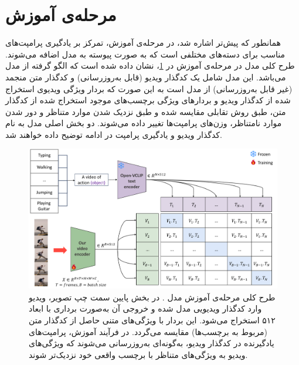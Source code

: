 \section{مرحله‌ی آموزش }
همانطور که پیش‌تر اشاره شد، در مرحله‌ی آموزش، تمرکز بر یادگیری پرامپت‌های مناسب برای دسته‌های مختلفی است که به صورت پیوسته به مدل اضافه می‌شوند. طرح کلی مدل در مرحله‌ی آموزش در \cref{fig.33}، نشان داده شده است که الگو گرفته از مدل  می‌باشد. این مدل شامل یک کدگذار ویدیو (قابل به‌روزرسانی) و کدگذار متن منجمد (غیر قابل به‌روزرسانی) از مدل  است به این صورت که بردار ویژگی ویدیوی استخراج شده از کدگذار ویدیو و بردارهای ویژگی برچسب‌های موجود استخراج شده از کدگذار متن، طبق روش تقابلی مقایسه شده و طبق نزدیک شدن موارد متناظر و دور شدن موارد نامتناظر، وزن‌های پرامپت‌ها تغییر داده می‌شوند. دو بخش اصلی مدل به نام کدگذار ویدیو و یادگیری پرامپت در ادامه توضیح داده خواهند شد. 
‌\begin{figure}
	\centering\includegraphics[scale=.50]{Images/Chapter3/train_phase.png}
	\caption[طرح کلی مرحله‌ی آموزش مدل ]{طرح کلی مرحله‌ی آموزش مدل .
	در بخش پایین سمت چپ تصویر، ویدیو وارد کدگذار ویدیویی مدل شده و خروجی آن به‌صورت برداری با ابعاد ۵۱۲ استخراج می‌شود. این بردار با ویژگی‌های متنی حاصل از کدگذار متن (مربوط به برچسب‌ها) مقایسه می‌گردد. در فرآیند آموزش، پرامپت‌های یادگیرنده در کدگذار ویدیو، به‌گونه‌ای به‌روزرسانی می‌شوند که ویژگی‌های ویدیو به ویژگی‌های متناظر با برچسب واقعی خود نزدیک‌تر شوند.
	}
	\label{fig.33}
\end{figure}
